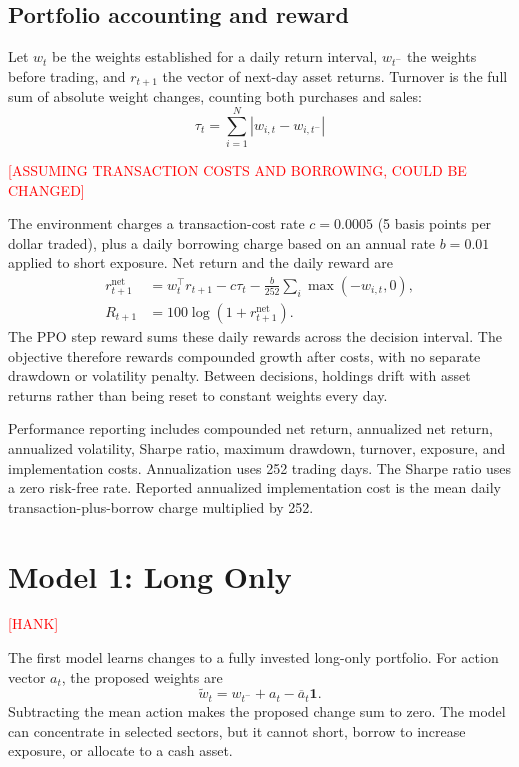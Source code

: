 \documentclass[11pt,letterpaper]{article}
\begin{document}
\subsection{Portfolio accounting and reward}

Let $w_t$ be the weights established for a daily return interval, $w_{t^-}$ the
weights before trading, and $r_{t+1}$ the vector of next-day asset returns.
Turnover is the full sum of absolute weight changes, counting both purchases
and sales:
\[
  \tau_t = \sum_{i=1}^{N} \left|w_{i,t} - w_{i,t^-}\right|
\]

 \textcolor{red}{[ASSUMING TRANSACTION COSTS AND BORROWING, COULD BE CHANGED]}

The environment charges a transaction-cost rate $c=0.0005$ (5 basis points per
dollar traded), plus a daily borrowing charge based on an annual rate $b=0.01$
applied to short exposure. Net return and the daily reward are
\begin{align*}
  r^{\mathrm{net}}_{t+1}
    &= w_t^\top r_{t+1}
       - c\tau_t
       - \frac{b}{252}\sum_i\max(-w_{i,t},0), \\
  R_{t+1} &= 100\log\!\left(1+r^{\mathrm{net}}_{t+1}\right).
\end{align*}
The PPO step reward sums these daily rewards across the decision interval.
The objective therefore rewards compounded growth after costs, with no separate
drawdown or volatility penalty. Between decisions, holdings drift with asset
returns rather than being reset to constant weights every day.

Performance reporting includes compounded net return, annualized net return,
annualized volatility, Sharpe ratio, maximum drawdown, turnover, exposure, and
implementation costs. Annualization uses 252 trading days. The Sharpe ratio uses
a zero risk-free rate. Reported annualized implementation cost is the mean daily
transaction-plus-borrow charge multiplied by 252.


\section{Model 1: Long Only}

 \textcolor{red}{[HANK]}

The first model learns changes to a fully invested long-only portfolio.
For action vector $a_t$, the proposed weights are
\[
  \widetilde w_t = w_{t^-} + a_t-\overline a_t\mathbf{1}.
\]
Subtracting the mean action makes the proposed change sum to zero. The model can 
concentrate in selected sectors, but it cannot short, borrow to increase exposure, or allocate to a cash asset.
\end{document}
